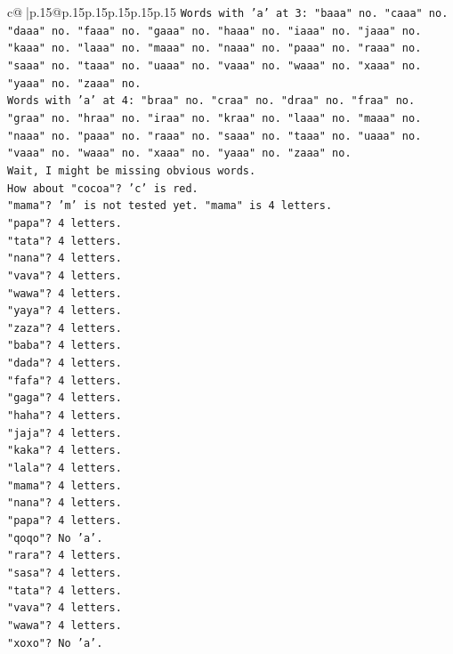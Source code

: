 \documentclass{article}
\begin{document}
{\begin{supertabular}{c@{$\;$}|p{.15\linewidth}@{}p{.15\linewidth}p{.15\linewidth}p{.15\linewidth}p{.15\linewidth}p{.15\linewidth}}
{{{\texttt{Words with 'a' at 3: "baaa" no. "caaa" no. "daaa" no. "faaa" no. "gaaa" no. "haaa" no. "iaaa" no. "jaaa" no. "kaaa" no. "laaa" no. "maaa" no. "naaa" no. "paaa" no. "raaa" no. "saaa" no. "taaa" no. "uaaa" no. "vaaa" no. "waaa" no. "xaaa" no. "yaaa" no. "zaaa" no.} \\
\texttt{Words with 'a' at 4: "braa" no. "craa" no. "draa" no. "fraa" no. "graa" no. "hraa" no. "iraa" no. "kraa" no. "laaa" no. "maaa" no. "naaa" no. "paaa" no. "raaa" no. "saaa" no. "taaa" no. "uaaa" no. "vaaa" no. "waaa" no. "xaaa" no. "yaaa" no. "zaaa" no.} \\
\texttt{Wait, I might be missing obvious words.} \\
\texttt{How about "cocoa"? 'c' is red.} \\
\texttt{"mama"? 'm' is not tested yet. "mama" is 4 letters.} \\
\texttt{"papa"? 4 letters.} \\
\texttt{"tata"? 4 letters.} \\
\texttt{"nana"? 4 letters.} \\
\texttt{"vava"? 4 letters.} \\
\texttt{"wawa"? 4 letters.} \\
\texttt{"yaya"? 4 letters.} \\
\texttt{"zaza"? 4 letters.} \\
\texttt{"baba"? 4 letters.} \\
\texttt{"dada"? 4 letters.} \\
\texttt{"fafa"? 4 letters.} \\
\texttt{"gaga"? 4 letters.} \\
\texttt{"haha"? 4 letters.} \\
\texttt{"jaja"? 4 letters.} \\
\texttt{"kaka"? 4 letters.} \\
\texttt{"lala"? 4 letters.} \\
\texttt{"mama"? 4 letters.} \\
\texttt{"nana"? 4 letters.} \\
\texttt{"papa"? 4 letters.} \\
\texttt{"qoqo"? No 'a'.} \\
\texttt{"rara"? 4 letters.} \\
\texttt{"sasa"? 4 letters.} \\
\texttt{"tata"? 4 letters.} \\
\texttt{"vava"? 4 letters.} \\
\texttt{"wawa"? 4 letters.} \\
\texttt{"xoxo"? No 'a'.} \\
}}}
\end{supertabular}}
\end{document}
